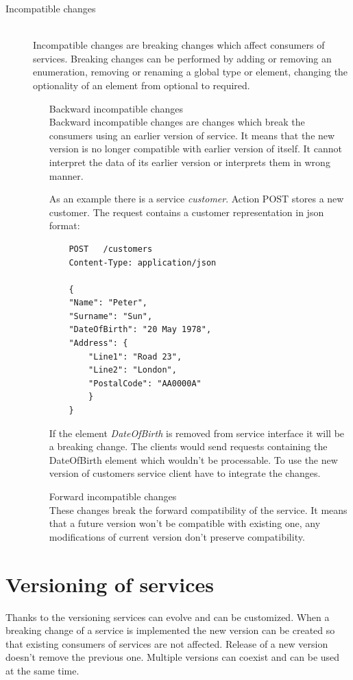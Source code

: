\begin{description}
  \item[Incompatible changes] \hfill \\
  Incompatible changes are breaking changes which affect consumers of services. Breaking changes can be performed by adding or removing an enumeration, removing or renaming a global type or element, changing the optionality of an element from optional to required.
  \begin{enumerate} 
    \item[Backward incompatible changes]  \hfill \\
    Backward incompatible changes are changes which break the consumers using an earlier version of service. It means that the new version is no longer compatible with earlier version of itself. It cannot interpret the data of its earlier version or interprets them in wrong manner.
    
    As an example there is a service \emph{customer}. Action POST stores a new customer. The request contains a customer representation in json format: 
    
\begin{lstlisting}
    POST   /customers
    Content-Type: application/json
    
    {
    "Name": "Peter",
    "Surname": "Sun",
    "DateOfBirth": "20 May 1978",
    "Address": {
        "Line1": "Road 23",
        "Line2": "London",
        "PostalCode": "AA0000A"
        }
    }
\end{lstlisting}

If the element \emph{DateOfBirth} is removed from service interface it will be a breaking change. The clients would send requests containing the DateOfBirth element which wouldn't be processable. To use the new version of customers service client have to integrate the changes. 

    \item[Forward incompatible changes] \hfill \\
    These changes break the forward compatibility of the service. It means that a future version won't be compatible with existing one, any modifications of current version don't preserve compatibility.
  \end{enumerate}
\end{description}

\section{Versioning of services}
\label{sec:verioningservices}
Thanks to the versioning services can evolve and can be customized. When a breaking change of a service is implemented the new version can be created so that existing consumers of services are not affected. Release of a new version doesn't remove the previous one. Multiple versions can coexist and can be used at the same time. 

